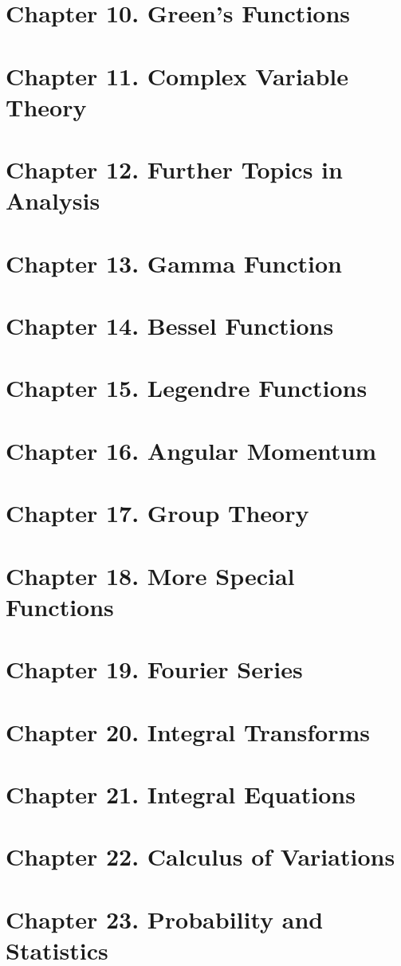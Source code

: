 \documentclass[11pt]{article}
\begin{document}
\section{Chapter 10. Green's Functions}

\clearpage
\section{Chapter 11. Complex Variable Theory}

\clearpage
\section{Chapter 12. Further Topics in Analysis}

\clearpage
\section{Chapter 13. Gamma Function}

\clearpage
\section{Chapter 14. Bessel Functions}

\clearpage
\section{Chapter 15. Legendre Functions}

\clearpage
\section{Chapter 16. Angular Momentum}

\clearpage
\section{Chapter 17. Group Theory}

\clearpage
\section{Chapter 18. More Special Functions}

\clearpage
\section{Chapter 19. Fourier Series}

\clearpage
\section{Chapter 20. Integral Transforms}

\clearpage
\section{Chapter 21. Integral Equations}

\clearpage
\section{Chapter 22. Calculus of Variations}

\clearpage
\section{Chapter 23. Probability and Statistics}

\end{document}
